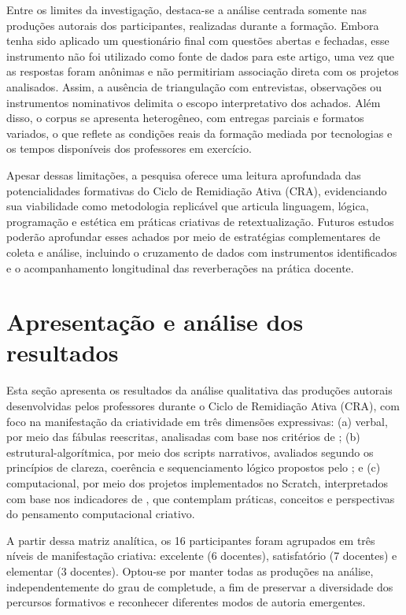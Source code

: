 \documentclass[portuguese]{textolivre}
\begin{document}
Entre os limites da investigação, destaca-se a análise centrada somente nas produções autorais dos participantes, realizadas durante a formação. Embora tenha sido aplicado um questionário final com questões abertas e fechadas, esse instrumento não foi utilizado como fonte de dados para este artigo, uma vez que as respostas foram anônimas e não permitiriam associação direta com os projetos analisados. Assim, a ausência de triangulação com entrevistas, observações ou instrumentos nominativos delimita o escopo interpretativo dos achados. Além disso, o corpus se apresenta heterogêneo, com entregas parciais e formatos variados, o que reflete as condições reais da formação mediada por tecnologias e os tempos disponíveis dos professores em exercício.

Apesar dessas limitações, a pesquisa oferece uma leitura aprofundada das potencialidades formativas do Ciclo de Remidiação Ativa (CRA), evidenciando sua viabilidade como metodologia replicável que articula linguagem, lógica, programação e estética em práticas criativas de retextualização. Futuros estudos poderão aprofundar esses achados por meio de estratégias complementares de coleta e análise, incluindo o cruzamento de dados com instrumentos identificados e o acompanhamento longitudinal das reverberações na prática docente.

\section{Apresentação e análise dos resultados}\label{sec-resultados}

Esta seção apresenta os resultados da análise qualitativa das produções autorais desenvolvidas pelos professores durante o Ciclo de Remidiação Ativa (CRA), com foco na manifestação da criatividade em três dimensões expressivas: (a) verbal, por meio das fábulas reescritas, analisadas com base nos critérios de \textcite{torrance1995}; (b) estrutural-algorítmica, por meio dos scripts narrativos, avaliados segundo os princípios de clareza, coerência e sequenciamento lógico propostos pelo \textcite{cieb2024}; e (c) computacional, por meio dos projetos implementados no Scratch, interpretados com base nos indicadores de \textcite{brennan2012}, que contemplam práticas, conceitos e perspectivas do pensamento computacional criativo.

A partir dessa matriz analítica, os 16 participantes foram agrupados em três níveis de manifestação criativa: excelente (6 docentes), satisfatório (7 docentes) e elementar (3 docentes). Optou-se por manter todas as produções na análise, independentemente do grau de completude, a fim de preservar a diversidade dos percursos formativos e reconhecer diferentes modos de autoria emergentes.
\end{document}
